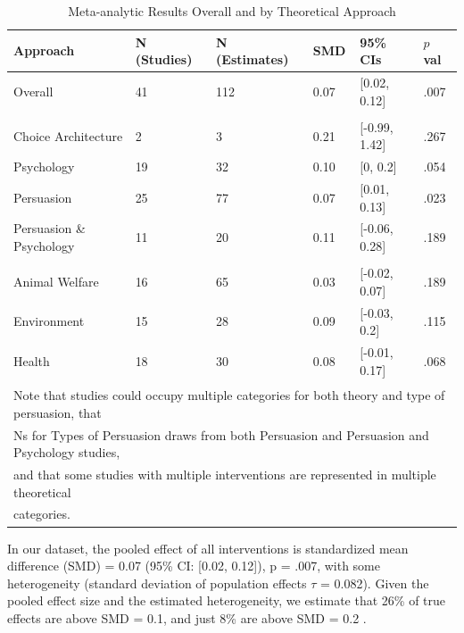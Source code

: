 \documentclass[sn-nature,referee,lineno,pdflatex]{sn-jnl}
\begin{document}
\begin{table}[!ht]
\centering
\caption{\label{tab:table_one}Meta-analytic Results Overall and by Theoretical Approach}
\centering
\begin{tabular}[t]{llllll}
\toprule
Approach & N (Studies) & N (Estimates) & SMD & 95\% CIs & $p$ val\\
\midrule
Overall & 41 & 112 & 0.07 & {}[0.02, 0.12] & .007\\
\addlinespace[0.5em]
\multicolumn{6}{l}{\textbf{Theory}}\\
\hspace{1em}Choice Architecture & 2 & 3 & 0.21 & {}[-0.99, 1.42] & .267\\
\hspace{1em}Psychology & 19 & 32 & 0.10 & {}[0, 0.2] & .054\\
\hspace{1em}Persuasion & 25 & 77 & 0.07 & {}[0.01, 0.13] & .023\\
\hspace{1em}Persuasion \& Psychology & 11 & 20 & 0.11 & {}[-0.06, 0.28] & .189\\
\addlinespace[0.5em]
\multicolumn{6}{l}{\textbf{Type of Persuasion}}\\
\hspace{1em}Animal Welfare & 16 & 65 & 0.03 & {}[-0.02, 0.07] & .189\\
\hspace{1em}Environment & 15 & 28 & 0.09 & {}[-0.03, 0.2] & .115\\
\hspace{1em}Health & 18 & 30 & 0.08 & {}[-0.01, 0.17] & .068\\
\bottomrule
\multicolumn{6}{l}{\textsuperscript{} Note that studies could occupy multiple categories for both theory and type of persuasion, that}\\
\multicolumn{6}{l}{Ns for Types of Persuasion draws from both Persuasion and Persuasion and Psychology studies,}\\
\multicolumn{6}{l}{and that some studies with multiple interventions are represented in multiple theoretical}\\
\multicolumn{6}{l}{categories.}\\
\end{tabular}
\end{table}

In our dataset, the pooled effect of all interventions is standardized
mean difference (SMD) = 0.07 (95\% CI: {[}0.02, 0.12{]}), p = .007, with
some heterogeneity (standard deviation of population effects \(\tau\) =
0.082). Given the pooled effect size and the estimated heterogeneity, we
estimate that 26\% of true effects are above SMD = 0.1, and just 8\% are
above SMD = 0.2 \citep{mathur2019, mathur2020robust}.
\end{document}
